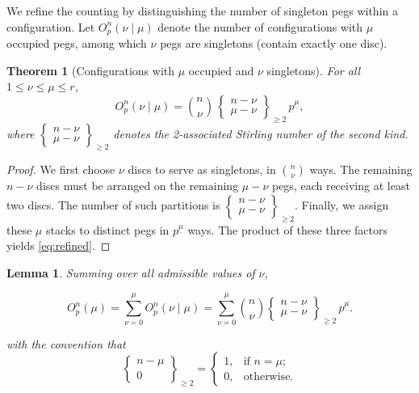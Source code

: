 \documentclass[letterpaper,12pt]{article}
\newtheorem{theorem}{Theorem}
\newtheorem{lemma}{Lemma}
\begin{document}
We refine the counting by distinguishing the number of singleton pegs within a configuration. Let \(O_p^n(\nu\mid\mu)\) denote the number of configurations with \(\mu\) occupied pegs, among which \(\nu\) pegs are singletons (contain exactly one disc).

\begin{theorem}[Configurations with \(\mu\) occupied and \(\nu\) singletons]
\label{th:refined}
For all \(1\le\nu\le\mu\le r\),
\begin{equation}
\label{eq:refined}
O_p^n(\nu\mid\mu)
=\binom{n}{\nu}\,
  \begin{Bmatrix} n-\nu\\ \mu-\nu \end{Bmatrix}_{\geq 2}\,
  p^{\underline{\mu}},
\end{equation}
where \(\begin{Bmatrix} n-\nu\\ \mu-\nu \end{Bmatrix}_{\geq 2}\) denotes the 2-associated Stirling number of the second kind.
\end{theorem}

\begin{proof}
We first choose \(\nu\) discs to serve as singletons, in \(\binom{n}{\nu}\) ways.  
The remaining \(n-\nu\) discs must be arranged on the remaining \(\mu-\nu\) pegs, each receiving at least two discs.  
The number of such partitions is \(\begin{Bmatrix} n-\nu\\ \mu-\nu \end{Bmatrix}_{\geq 2}\).  
Finally, we assign these \(\mu\) stacks to distinct pegs in \(p^{\underline{\mu}}\) ways.  
The product of these three factors yields \eqref{eq:refined}.
\end{proof}

\begin{lemma}
\label{cor:split-Opnu}
Summing over all admissible values of \(\nu\),

\begin{equation}
O_p^n(\mu)=\sum_{\nu=0}^{\mu}O_p^n(\nu\mid\mu)
=\sum_{\nu=0}^{\mu}\binom{n}{\nu}
   \begin{Bmatrix} n-\nu\\ \mu-\nu \end{Bmatrix}_{\geq 2}\,p^{\underline{\mu}}.
\end{equation}

with the convention that
\[
\begin{Bmatrix} n - \mu \\ 0 \end{Bmatrix}_{\geq 2} =
\begin{cases}
1, & \text{if } n = \mu; \\
0, & \text{otherwise}.
\end{cases}
\]
\end{lemma}
\end{document}
